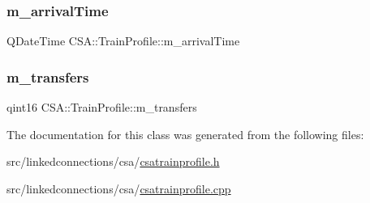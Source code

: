 \mbox{\label{classCSA_1_1TrainProfile_adba3b60fe32bdd008973662cd4c0a722}} 
\subsubsection{\texorpdfstring{m\+\_\+arrival\+Time}{m\_arrivalTime}}
{\footnotesize\ttfamily Q\+Date\+Time C\+S\+A\+::\+Train\+Profile\+::m\+\_\+arrival\+Time\hspace{0.3cm}{\ttfamily [private]}}

\mbox{\label{classCSA_1_1TrainProfile_af0a6f25b6a87259edfe8a4024176d2fd}} 
\subsubsection{\texorpdfstring{m\+\_\+transfers}{m\_transfers}}
{\footnotesize\ttfamily qint16 C\+S\+A\+::\+Train\+Profile\+::m\+\_\+transfers\hspace{0.3cm}{\ttfamily [private]}}



The documentation for this class was generated from the following files\+:\begin{DoxyCompactItemize}
\item 
src/linkedconnections/csa/\mbox{\hyperlink{csatrainprofile_8h}{csatrainprofile.\+h}}\item 
src/linkedconnections/csa/\mbox{\hyperlink{csatrainprofile_8cpp}{csatrainprofile.\+cpp}}\end{DoxyCompactItemize}
